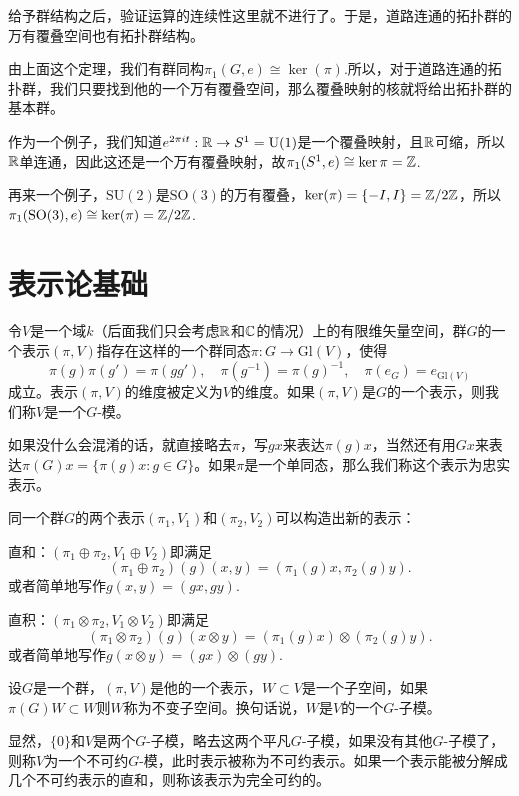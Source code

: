 \para 给予群结构之后，验证运算的连续性这里就不进行了。于是，道路连通的拓扑群的万有覆叠空间也有拓扑群结构。

\para 由上面这个定理，我们有群同构$\pi_1(G,e)\cong \ker(\pi)$.所以，对于道路连通的拓扑群，我们只要找到他的一个万有覆叠空间，那么覆叠映射的核就将给出拓扑群的基本群。\endpara

作为一个例子，我们知道$e^{2\pi it}:\mathbb{R}\to S^1=\mathrm{U}(1)$是一个覆叠映射，且$\mathbb{R}$可缩，所以$\mathbb{R}$单连通，因此这还是一个万有覆叠映射，故$\pi_1(S^1,e)\cong \ker{\pi}=\mathbb{Z}$.

再来一个例子，$\mathrm{SU}(2)$是$\mathrm{SO}(3)$的万有覆叠，$\ker(\pi)=\{-I,I\}=\mathbb{Z}/2\mathbb{Z}$，所以$\pi_1(\mathrm{SO}(3),e)\cong \ker(\pi)=\mathbb{Z}/2\mathbb{Z}$.


\chapter{表示论基础}

\begin{para}
令$V$是一个域$k$（后面我们只会考虑$\mathbb{R}$和$\mathbb{C}$的情况）上的有限维矢量空间，群$G$的一个表示$(\pi, V)$指存在这样的一个群同态$\pi:G\rightarrow \mathrm{Gl}(V)$，使得
\[
	\pi(g)\pi(g')=\pi(gg'),\quad \pi(g^{-1})=\pi(g)^{-1},\quad \pi(e_G)=e_{\mathrm{Gl}(V)}
\]
成立。表示$(\pi, V)$的维度被定义为$V$的维度。如果$(\pi, V)$是$G$的一个表示，则我们称$V$是一个$G$-模。
\end{para}

如果没什么会混淆的话，就直接略去$\pi$，写$gx$来表达$\pi(g)x$，当然还有用$Gx$来表达$\pi(G)x=\{\pi(g)x:g\in G\}$。如果$\pi$是一个单同态，那么我们称这个表示为忠实表示。

\para 同一个群$G$的两个表示$(\pi_1,V_1)$和$(\pi_2,V_2)$可以构造出新的表示：

 直和：$(\pi_1\oplus \pi_2,V_1\oplus V_2)$即满足
\[
	(\pi_1\oplus \pi_2)(g)(x,y)=(\pi_1(g)x,\pi_2(g)y).
\]
或者简单地写作$g(x,y)=(gx,gy)$.

 直积：$(\pi_1\otimes \pi_2,V_1\otimes V_2)$即满足
\[
	(\pi_1\otimes \pi_2)(g)(x\otimes y)=(\pi_1(g)x)\otimes (\pi_2(g)y).
\]
或者简单地写作$g(x\otimes y)=(gx)\otimes(gy)$.

\begin{para}
设$G$是一个群，$(\pi,V)$是他的一个表示，$W\subset V$是一个子空间，如果$\pi(G)W\subset W$则$W$称为不变子空间。换句话说，$W$是$V$的一个$G$-子模。

显然，$\{0\}$和$V$是两个$G$-子模，略去这两个平凡$G$-子模，如果没有其他$G$-子模了，则称$V$为一个不可约$G$-模，此时表示被称为不可约表示。如果一个表示能被分解成几个不可约表示的直和，则称该表示为完全可约的。
\end{para}

